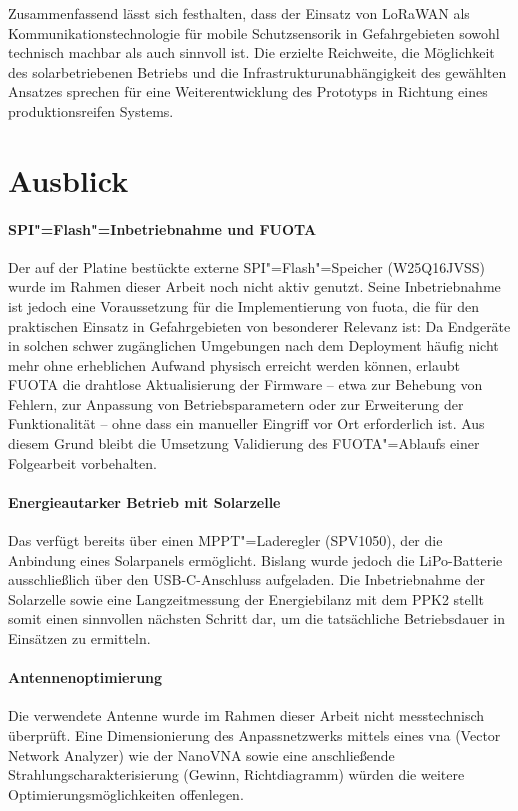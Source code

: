 Zusammenfassend lässt sich festhalten, dass der Einsatz von LoRaWAN
als Kommunikationstechnologie für mobile Schutzsensorik in
Gefahrgebieten sowohl technisch machbar als auch sinnvoll ist.
Die erzielte Reichweite, die Möglichkeit des solarbetriebenen
Betriebs und die Infrastrukturunabhängigkeit des gewählten Ansatzes
sprechen für eine Weiterentwicklung des Prototyps in Richtung eines
produktionsreifen Systems.

\section{Ausblick}

\paragraph{SPI"=Flash"=Inbetriebnahme und FUOTA}
Der auf der Platine bestückte externe SPI"=Flash"=Speicher (W25Q16JVSS)
wurde im Rahmen dieser Arbeit noch nicht aktiv genutzt. Seine Inbetriebnahme ist jedoch eine Voraussetzung für die Implementierung
von \acrfull{fuota}, die für den praktischen Einsatz in Gefahrgebieten von besonderer Relevanz ist: 
Da Endgeräte in solchen schwer zugänglichen Umgebungen nach dem Deployment häufig nicht mehr ohne erheblichen Aufwand 
physisch erreicht werden können, erlaubt FUOTA die drahtlose Aktualisierung der Firmware -- etwa zur Behebung von Fehlern, 
zur Anpassung von Betriebsparametern oder zur Erweiterung der Funktionalität -- ohne
dass ein manueller Eingriff vor Ort erforderlich ist. Aus diesem Grund bleibt die Umsetzung
Validierung des FUOTA"=Ablaufs  einer Folgearbeit vorbehalten.

\paragraph{Energieautarker Betrieb mit Solarzelle}
Das verfügt bereits über einen MPPT"=Laderegler (SPV1050), der die Anbindung eines Solarpanels ermöglicht.
Bislang wurde jedoch die LiPo-Batterie ausschließlich über den USB-C-Anschluss aufgeladen.
Die Inbetriebnahme der Solarzelle sowie eine Langzeitmessung der Energiebilanz mit dem PPK2 stellt somit 
einen sinnvollen nächsten Schritt dar, um die tatsächliche Betriebsdauer in Einsätzen zu ermitteln.

\paragraph{Antennenoptimierung}
Die verwendete Antenne wurde im Rahmen dieser Arbeit nicht messtechnisch überprüft. Eine 
Dimensionierung des Anpassnetzwerks mittels eines \acrshort{vna} (Vector Network Analyzer) wie der NanoVNA
sowie eine anschließende Strahlungscharakterisierung (Gewinn, Richtdiagramm) würden die
weitere Optimierungsmöglichkeiten offenlegen. 

